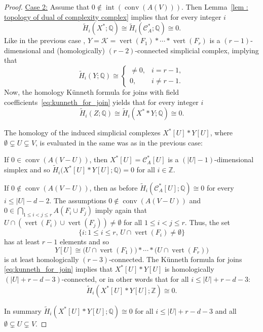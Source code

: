 \documentclass[a4paper,11pt,reqno, english]{amsart}
\theoremstyle{definition}
\theoremstyle{remark}
\newcommand\Z{\mathbb Z}
\newcommand\Q{\mathbb Q}
\newcommand\CC{\mathscr C}
\DeclareMathOperator{\vertex}{\mathrm{vert}}
\DeclareMathOperator{\interior}{\mathrm{int}}
\DeclareMathOperator{\conv}{\mathrm{conv}}
\begin{document}
\begin{proof}
	\medskip\noindent\ul{Case 2:} Assume that $0\notin \interior(\conv (A(V)))$.
	Then  Lemma~\ref{lem : topology of dual of complexity complex} implies that for every integer $i$
	\[
		\widetilde{H}_i(X^*;\Q)\cong \widetilde{H}_i(\CC_A^*;\Q) \cong 0.
	\]
	Like in the previous case , $Y=\mathcal{K}=\vertex ({F_1})*\cdots* \vertex ({F_r})$ is a $(r-1)$-dimensional and (homologically) $(r-2)$-connected simplicial complex, implying that
	\[
		\widetilde{H}_i(Y;\Q) \cong
		\begin{cases}
			\neq 0, & i= r-1,    \\
			0,      & i\neq r-1.
		\end{cases}
	\]
	Now, the homology K\"unneth formula for joins with field coefficients~\eqref{eq:kunneth_for_join} yields that for every integer $i$
	\begin{equation}\label{eq : homology of Z -- C03-2}
		\widetilde{H}_i(Z;\Q) \cong \widetilde{H}_i(X^**Y;\Q) \cong 0.
	\end{equation}



	\medskip
	The homology of the induced simplicial complexes $X^*[U]*Y[U]$, where $\emptyset \subsetneq  U \subsetneq  V$, is evaluated in the same was as in the previous case:
	\begin{compactenum}[\quad\rm (1)]
		\item If $0\in\conv(A(V-U))$, then $X^*[U]=\CC_A^*[U]$ is a $(|U|-1)$-dimensional simplex and so $\widetilde{H}_{i}\big(X^*[U]*Y[U];\Q\big)=0$ for all $i\in\Z$.
		\item If $0\notin\conv(A(V-U))$, then as before $\widetilde{H}_i(\CC_A^*[U];\Q)\cong 0$ for every  $i\leq |U|-d-2$. The assumptions  $0\notin\conv(A(V-U))$ and $0\in \bigcap_{1\leq i<j\leq r} A(F_i\cup F_j)$ imply again that $U \cap ( \vertex(F_i)\cup \vertex(F_j))   \neq\emptyset$ for all $1\leq i<j\leq r$.
		Thus, the set \[\{i : 1\leq i\leq r,\, U \cap\vertex(F_i)\neq\emptyset \}\] has at least $r-1$ elements and so
		\[
			Y[U]\cong \big( U\cap \vertex({F_1})\big) *\cdots *\big( U\cap \vertex ({F_{r}})\big)
		\]
		is at least homologically $(r-3)$-connected.
		The K\"unneth formula for joins \eqref{eq:kunneth_for_join} implies that $X^*[U]*Y[U]$ is homologically $(|U|+r-d-3)$-connected, or in other words that for all $i\leq |U|+r-d-3$:
		\[
			\widetilde{H}_i(X^*[U]*Y[U];\Z)\cong 0.
		\]
	\end{compactenum}
	In summary $\widetilde{H}_i(X^*[U]*Y[U];\Q)\cong 0$ for all $i\leq |U|+r-d-3$ and all $\emptyset \subsetneq  U \subsetneq  V$.


\end{proof}
\end{document}

